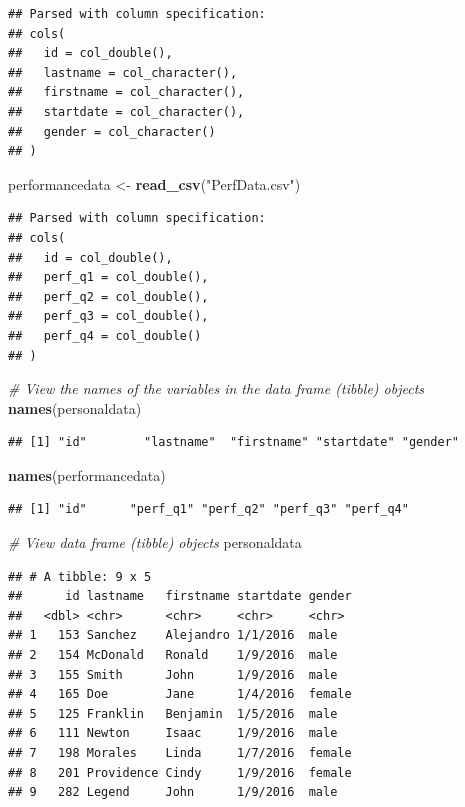 \documentclass[]{book}
\newenvironment{Shaded}{\begin{snugshade}}{\end{snugshade}}
\newcommand{\KeywordTok}[1]{\textcolor[rgb]{0.13,0.29,0.53}{\textbf{#1}}}
\newcommand{\StringTok}[1]{\textcolor[rgb]{0.31,0.60,0.02}{#1}}
\newcommand{\CommentTok}[1]{\textcolor[rgb]{0.56,0.35,0.01}{\textit{#1}}}
\newcommand{\NormalTok}[1]{#1}
\begin{document}
\begin{verbatim}
## Parsed with column specification:
## cols(
##   id = col_double(),
##   lastname = col_character(),
##   firstname = col_character(),
##   startdate = col_character(),
##   gender = col_character()
## )
\end{verbatim}

\begin{Shaded}
\begin{Highlighting}[]
\NormalTok{performancedata <-}\StringTok{ }\KeywordTok{read_csv}\NormalTok{(}\StringTok{"PerfData.csv"}\NormalTok{)}
\end{Highlighting}
\end{Shaded}

\begin{verbatim}
## Parsed with column specification:
## cols(
##   id = col_double(),
##   perf_q1 = col_double(),
##   perf_q2 = col_double(),
##   perf_q3 = col_double(),
##   perf_q4 = col_double()
## )
\end{verbatim}

\begin{Shaded}
\begin{Highlighting}[]
\CommentTok{# View the names of the variables in the data frame (tibble) objects}
\KeywordTok{names}\NormalTok{(personaldata)}
\end{Highlighting}
\end{Shaded}

\begin{verbatim}
## [1] "id"        "lastname"  "firstname" "startdate" "gender"
\end{verbatim}

\begin{Shaded}
\begin{Highlighting}[]
\KeywordTok{names}\NormalTok{(performancedata)}
\end{Highlighting}
\end{Shaded}

\begin{verbatim}
## [1] "id"      "perf_q1" "perf_q2" "perf_q3" "perf_q4"
\end{verbatim}

\begin{Shaded}
\begin{Highlighting}[]
\CommentTok{# View data frame (tibble) objects}
\NormalTok{personaldata}
\end{Highlighting}
\end{Shaded}

\begin{verbatim}
## # A tibble: 9 x 5
##      id lastname   firstname startdate gender
##   <dbl> <chr>      <chr>     <chr>     <chr> 
## 1   153 Sanchez    Alejandro 1/1/2016  male  
## 2   154 McDonald   Ronald    1/9/2016  male  
## 3   155 Smith      John      1/9/2016  male  
## 4   165 Doe        Jane      1/4/2016  female
## 5   125 Franklin   Benjamin  1/5/2016  male  
## 6   111 Newton     Isaac     1/9/2016  male  
## 7   198 Morales    Linda     1/7/2016  female
## 8   201 Providence Cindy     1/9/2016  female
## 9   282 Legend     John      1/9/2016  male
\end{verbatim}
\end{document}
